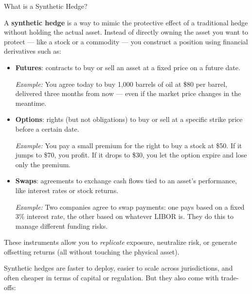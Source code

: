 \begin{TechnicalSidebar}{What is a Synthetic Hedge?}

  A \textbf{synthetic hedge} is a way to mimic the protective effect of a traditional hedge without 
  holding the actual asset.  
  Instead of directly owning the asset you want to protect --- like a stock or a commodity --- you 
  construct a position using financial derivatives such as:

  \medskip

  \begin{itemize}
    \item \textbf{Futures}: contracts to buy or sell an asset at a fixed price on a future date.  

    \medskip

    \textit{Example:} You agree today to buy 1,000 barrels of oil at \$80 per barrel, delivered three months from now — even if the market price changes in the meantime.

    \medskip
  
    \item \textbf{Options}: rights (but not obligations) to buy or sell at a specific strike price before a certain date.  

    \medskip

    \textit{Example:} You pay a small premium for the right to buy a stock at \$50. If it jumps to \$70, you profit. If it drops to \$30, you let the option expire and lose only the premium.

    \medskip
  
    \item \textbf{Swaps}: agreements to exchange cash flows tied to an asset’s performance, like interest rates or stock returns.  

    \medskip

    \textit{Example:} Two companies agree to swap payments: one pays based on a fixed 3\% interest rate, the other based on whatever LIBOR is. They do this to manage different funding risks.
  \end{itemize}
  

  \medskip

  These instruments allow you to \textit{replicate} exposure, neutralize risk, or generate offsetting returns (all without 
  touching the physical asset).

  \medskip

  Synthetic hedges are faster to deploy, easier to scale across jurisdictions, and often cheaper in terms of capital 
  or regulation. But they also come with trade-offs:


\end{TechnicalSidebar}
